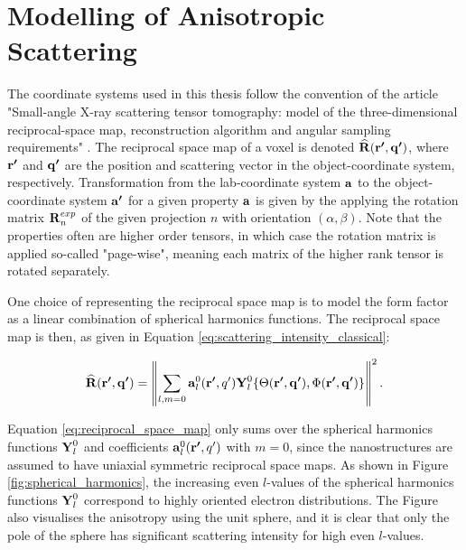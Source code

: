 \section{Modelling of Anisotropic Scattering} \label{sec:modelling_scattering}
The coordinate systems used in this thesis follow the convention of the article "Small-angle X-ray scattering tensor tomography:
model of the three-dimensional reciprocal-space
map, reconstruction algorithm and angular
sampling requirements" \cite{liebi2018small}.
The reciprocal space map of a voxel is denoted $\bm{\mathrm{\widehat{R}}}(\bm{\mathrm{r'}}, \bm{\mathrm{q'}})$,
where $\bm{\mathrm{r'}}$ and $\bm{\mathrm{q'}}$ are the position and scattering vector in the object-coordinate system, respectively.
Transformation from the lab-coordinate system $\bm{\mathrm{a}}$ to the object-coordinate system $\bm{\mathrm{a'}}$ for a given property $\bm{\mathrm{a}}$
is given by the applying the rotation matrix $\bm{\mathrm{R}}_{n}^{exp}$ of the given projection $n$ with orientation $\left(\alpha,\beta\right)$.
Note that the properties often are higher order tensors, in which case the rotation matrix is applied so-called "page-wise",
meaning each matrix of the higher rank tensor is rotated separately.


One choice of representing the reciprocal space map is to model the form factor as a linear combination of spherical harmonics functions.
The reciprocal space map is then,
as given in Equation \eqref{eq:scattering_intensity_classical}:

\begin{equation}\label{eq:reciprocal_space_map}
    \bm{\mathrm{\widehat{R}}}(\bm{\mathrm{r'}}, \bm{\mathrm{q'}}) = \left\| \sum_{l, m=0} \bm{\mathrm{a}}_{l}^{0}(\bm{\mathrm{r'}}, q') \bm{\mathrm{Y}}_{l}^{0} \{ \Theta(\bm{\mathrm{r'}}, \bm{\mathrm{q'}}), \Phi(\bm{\mathrm{r'}}, \bm{\mathrm{q'}}) \} \right\|^{2}.
\end{equation}

Equation \eqref{eq:reciprocal_space_map} only sums over the spherical harmonics functions $\bm{\mathrm{Y}}_{l}^{0}$ and coefficients $\bm{\mathrm{a}}_{l}^{0}(\bm{\mathrm{r'}}, q')$ with $m=0$,
since the nanostructures are assumed to have uniaxial symmetric reciprocal space maps.
As shown in Figure \ref{fig:spherical_harmonics}, the increasing even $l$-values of the spherical harmonics functions $\bm{\mathrm{Y}}_{l}^{0}$ correspond to highly oriented electron distributions.
The Figure also visualises the anisotropy using the unit sphere, and it is clear that only the pole of the sphere has significant scattering intensity for high even $l$-values.

